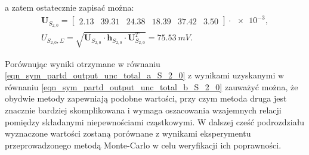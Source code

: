 a zatem ostatecznie zapisać można:
\begin{gather}
\mathbf{U}_{S_{2,0}} = 
\begin{bmatrix}
\num{2.13} & \num{39.31} & \num{24.38} & \num{18.39} & \num{37.42} & \num{3.50}
\end{bmatrix} \cdot \num{e-3}
\label{eqn_sym_partd_output_unc_sumuvectval_S_2_0}, \\
U_{S_{2,0},\Sigma} = \sqrt{\mathbf{U}_{S_{2,0}} \cdot \mathbf{h}_{S_{2,0}} \cdot \mathbf{U}_{S_{2,0}}^{T}} = \qty{75.53}{mV} \label{eqn_sym_partd_output_unc_total_b_S_2_0}.
\end{gather}

Porównując wyniki otrzymane w równaniu \eqref{eqn_sym_partd_output_unc_total_a_S_2_0} z wynikami uzyskanymi w równaniu \eqref{eqn_sym_partd_output_unc_total_b_S_2_0} zauważyć można, że obydwie metody zapewniają podobne wartości, przy czym metoda druga jest znacznie bardziej skomplikowana i wymaga oszacowania wzajemnych relacji pomiędzy składanymi niepewnościami cząstkowymi. W dalszej cześć podrozdziału wyznaczone wartości zostaną porównane z wynikami eksperymentu przeprowadzonego metodą Monte-Carlo w celu weryfikacji ich poprawności.

